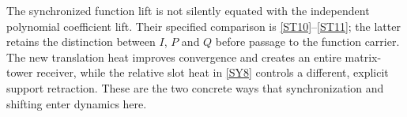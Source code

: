 The synchronized function lift is not silently equated with the independent polynomial coefficient lift. Their specified comparison is \eqref{ST10}--\eqref{ST11}; the latter retains the distinction between $I$, $P$ and $Q$ before passage to the function carrier. The new translation heat improves convergence and creates an entire matrix-tower receiver, while the relative slot heat in \eqref{SY8} controls a different, explicit support retraction. These are the two concrete ways that synchronization and shifting enter dynamics here.

